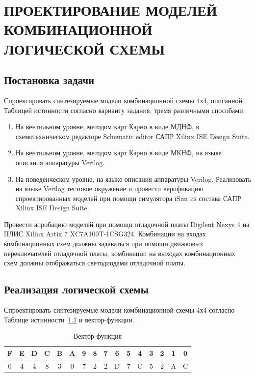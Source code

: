 \chapter{ПРОЕКТИРОВАНИЕ МОДЕЛЕЙ КОМБИНАЦИОННОЙ ЛОГИЧЕСКОЙ СХЕМЫ}

\section {Постановка задачи}
Спроектировать синтезируемые модели комбинационной схемы 4х4, описанной
Таблицей истинности согласно варианту задания, тремя различными способами:
\begin{enumerate}
	\item На вентильном уровне, методом карт Карно в виде МДНФ, в схемотехническом
	редакторе Schematic editor САПР Xilinx ISE Design Suite.
	\item На вентильном уровне, методом карт Карно в виде МКНФ, на языке описания
	аппаратуры Verilog.
	\item На поведенческом уровне, на языке описания аппаратуры Verilog.
	Реализовать на языке Verilog тестовое окружение и провести верификацию
	спроектированных моделей при помощи симулятора iSim из состава
	САПР Xilinx ISE Design Suite.
\end{enumerate}

Провести апробацию моделей при помощи отладочной платы Digilent Nexys 4 на
ПЛИС Xilinx Artix 7 XC7A100T-1CSG324. Комбинации на входах комбинационных схем
должны задаваться при помощи движковых переключателей отладочной платы,
комбинации на выходах комбинационных схем должны отображаться светодиодами
отладочной платы.
\section {Реализация логической схемы}
Спроектировать синтезируемые модели комбинационной схемы 4х4 согласно Таблице истинности~\ref{tab:func-vector1}  и вектор-функции.

\begin{table}[h!]
	\centering
		\caption{Вектор-функция}
		\begin{tabular}{|c|c|c|c|c|c|c|c|c|c|c|c|c|c|c|c|}
			\hline
			F & E & D & C & B & A & 9 & 8 & 7 & 6 & 5 & 4 & 3 & 2 & 1 & 0 \\ \hline\hline
			0 & 4 & 4 & 8 & 3 & 0 & 7 & 2 & 2 & D & 7 & C & 5 & 2 & A & C \\ \hline
		\end{tabular}
		\label{tab:func-vector1}
\end{table}
